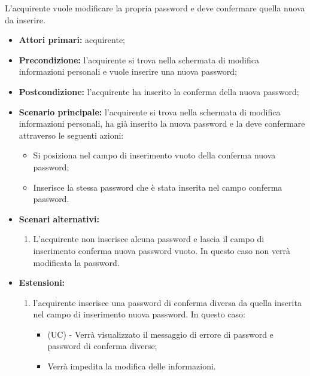 L'acquirente vuole modificare la propria password e deve confermare quella nuova da inserire.
\begin{itemize}
    \item \textbf{Attori primari:} acquirente;
    \item \textbf{Precondizione:} l'acquirente si trova nella schermata di modifica informazioni personali e vuole inserire una nuova password;
    \item \textbf{Postcondizione:} l'acquirente ha inserito la conferma della nuova password;
    \item \textbf{Scenario principale:} l'acquirente si trova nella schermata di modifica informazioni personali, ha già inserito la nuova password e la deve confermare attraverso le seguenti azioni:
        \begin{itemize}
            \item Si posiziona nel campo di inserimento vuoto della conferma nuova password;
            \item Inserisce la stessa password che è stata inserita nel campo conferma password.
        \end{itemize}
    \item \textbf{Scenari alternativi:} 
    \begin{enumerate}
        \item L'acquirente non inserisce alcuna password e lascia il campo di inserimento conferma nuova password vuoto. In questo caso non verrà modificata la password.
    \end{enumerate}
    \item \textbf{Estensioni:} 
    \begin{enumerate}[label=\lett] 
        \item l'acquirente inserisce una password di conferma diversa da quella inserita nel campo di inserimento nuova password. In questo caso:
        \begin{itemize}
            \item (UC) - Verrà visualizzato il messaggio di errore di password e password di conferma diverse;
            \item Verrà impedita la modifica delle informazioni.
        \end{itemize}
    \end{enumerate}
\end{itemize}


